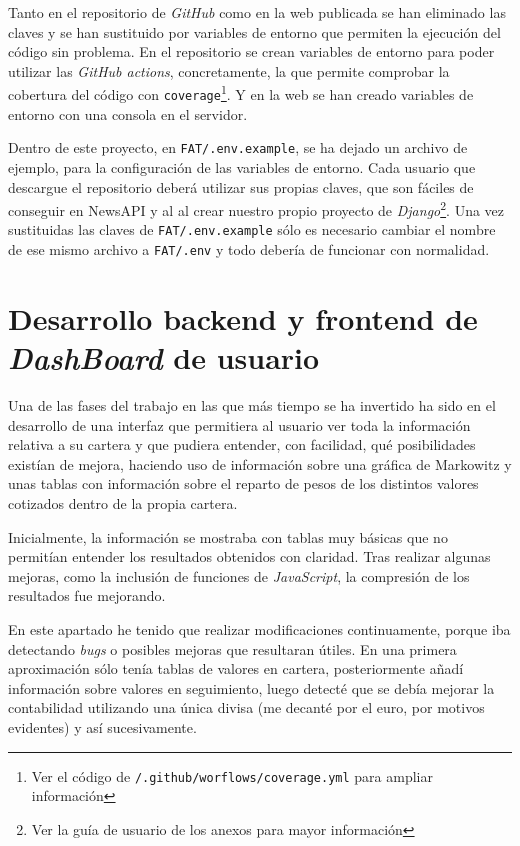 Tanto en el repositorio de \emph{GitHub} como en la web publicada se han eliminado las claves y se han sustituido por variables de entorno que permiten la ejecución del código sin problema. En el repositorio se crean variables de entorno para poder utilizar las \emph{GitHub actions}, concretamente, la que permite comprobar la cobertura del código con \texttt{coverage}\footnote{Ver el código de \texttt{/.github/worflows/coverage.yml} para ampliar información}. Y en la web se han creado variables de entorno con una consola en el servidor. 

Dentro de este proyecto, en \texttt{FAT/.env.example}, se ha dejado un archivo de ejemplo, para la configuración de las variables de entorno. Cada usuario que descargue el repositorio deberá utilizar sus propias claves, que son fáciles de conseguir en NewsAPI y al al crear nuestro propio proyecto de \emph{Django}\footnote{Ver la guía de usuario de los anexos para mayor información}. Una vez sustituidas las claves de \texttt{FAT/.env.example} sólo es necesario cambiar el nombre de ese mismo archivo a \texttt{FAT/.env} y todo debería de funcionar con normalidad. 



\section{Desarrollo backend y frontend de \emph{DashBoard} de usuario}\label{desarrollo_dashboard}

Una de las fases del trabajo en las que más tiempo se ha invertido ha sido en el desarrollo de una interfaz que permitiera al usuario ver toda la información relativa a su cartera y que pudiera entender, con facilidad, qué posibilidades existían de mejora, haciendo uso de información sobre una gráfica de Markowitz y unas tablas con información sobre el reparto de pesos de los distintos valores cotizados dentro de la propia cartera. 

Inicialmente, la información se mostraba con tablas muy básicas que no permitían entender los resultados obtenidos con claridad. Tras realizar algunas mejoras, como la inclusión de funciones de \emph{JavaScript}, la compresión de los resultados fue mejorando. 

En este apartado he tenido que realizar modificaciones continuamente, porque iba detectando \emph{bugs} o posibles mejoras que resultaran útiles. En una primera aproximación sólo tenía tablas de valores en cartera, posteriormente añadí información sobre valores en seguimiento, luego detecté que se debía mejorar la contabilidad utilizando una única divisa (me decanté por el euro, por motivos evidentes) y así sucesivamente. 

